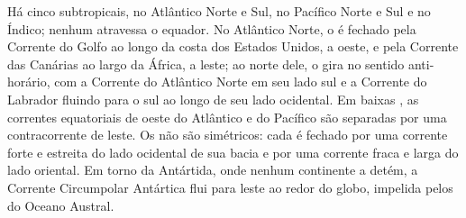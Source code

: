 Há cinco  subtropicais, no Atlântico Norte e Sul, no Pacífico Norte e Sul e no Índico; nenhum
atravessa o equador. No Atlântico Norte, o  é fechado pela Corrente do Golfo ao longo da
costa dos Estados Unidos, a oeste, e pela Corrente das Canárias ao largo da África, a leste; ao norte
dele, o  gira no sentido anti-horário, com a Corrente do Atlântico Norte em seu lado sul e a
Corrente do Labrador fluindo para o sul ao longo de seu lado ocidental. Em baixas , as correntes
equatoriais de oeste do Atlântico e do Pacífico são separadas por uma contracorrente de leste. Os  não
são simétricos: cada  é fechado por uma corrente forte e estreita do lado ocidental de sua
bacia e por uma corrente fraca e larga do lado oriental. Em torno da Antártida, onde nenhum continente a
detém, a Corrente Circumpolar Antártica flui para leste ao redor do globo, impelida pelos 
do Oceano Austral.

